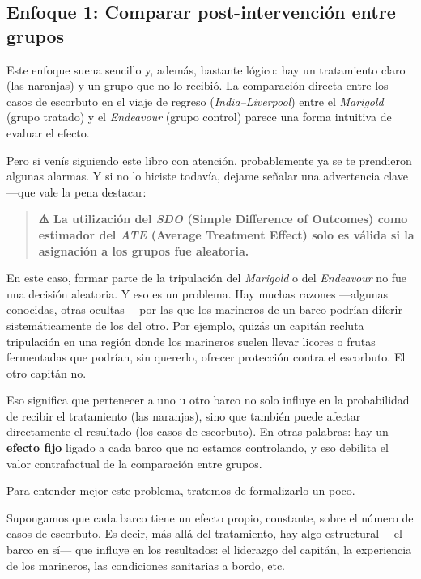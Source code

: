 \documentclass[
  letterpaper,
  DIV=11,
  numbers=noendperiod,
  oneside]{scrreprt}
\begin{document}
\hypertarget{enfoque-1-comparar-post-intervenciuxf3n-entre-grupos}{%
\subsection{Enfoque 1: Comparar post-intervención entre
grupos}\label{enfoque-1-comparar-post-intervenciuxf3n-entre-grupos}}

Este enfoque suena sencillo y, además, bastante lógico: hay un
tratamiento claro (las naranjas) y un grupo que no lo recibió. La
comparación directa entre los casos de escorbuto en el viaje de regreso
(\emph{India--Liverpool}) entre el \emph{Marigold} (grupo tratado) y el
\emph{Endeavour} (grupo control) parece una forma intuitiva de evaluar
el efecto.

Pero si venís siguiendo este libro con atención, probablemente ya se te
prendieron algunas alarmas. Y si no lo hiciste todavía, dejame señalar
una advertencia clave ---que vale la pena destacar:

\begin{quote}
\textbf{⚠️ La utilización del \emph{SDO} (Simple Difference of Outcomes)
como estimador del \emph{ATE} (Average Treatment Effect) solo es válida
si la asignación a los grupos fue aleatoria.}
\end{quote}

En este caso, formar parte de la tripulación del \emph{Marigold} o del
\emph{Endeavour} no fue una decisión aleatoria. Y eso es un problema.
Hay muchas razones ---algunas conocidas, otras ocultas--- por las que
los marineros de un barco podrían diferir sistemáticamente de los del
otro. Por ejemplo, quizás un capitán recluta tripulación en una región
donde los marineros suelen llevar licores o frutas fermentadas que
podrían, sin quererlo, ofrecer protección contra el escorbuto. El otro
capitán no.

Eso significa que pertenecer a uno u otro barco no solo influye en la
probabilidad de recibir el tratamiento (las naranjas), sino que también
puede afectar directamente el resultado (los casos de escorbuto). En
otras palabras: hay un \textbf{efecto fijo} ligado a cada barco que no
estamos controlando, y eso debilita el valor contrafactual de la
comparación entre grupos.

Para entender mejor este problema, tratemos de formalizarlo un poco.

Supongamos que cada barco tiene un efecto propio, constante, sobre el
número de casos de escorbuto. Es decir, más allá del tratamiento, hay
algo estructural ---el barco en sí--- que influye en los resultados: el
liderazgo del capitán, la experiencia de los marineros, las condiciones
sanitarias a bordo, etc.
\end{document}
